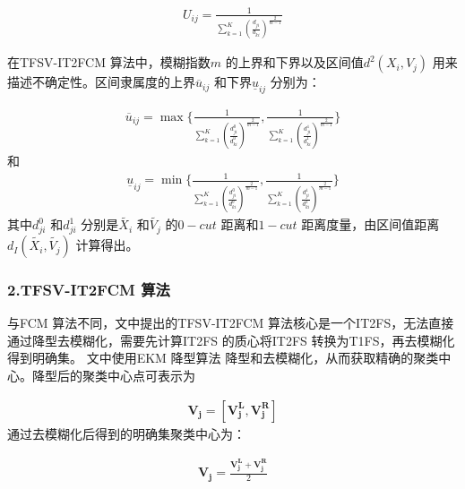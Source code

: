 \begin{equation}\label{eq:12}
    \begin{split}
        U_{ij} = \frac{1}{\sum_{k=1}^K {(\frac{d_{ji}}{d_{ki}})}^{\frac{2}{m-1}}}
    \end{split}
\end{equation}

在TFSV-IT2FCM 算法中，模糊指数$m$ 的上界和下界以及区间值$d^2(X_i,V_j)$ 用来描述不确定性。区间隶属度的上界$\overline{u}_{ij}$ 和下界$\underline{u}_{ij}$ 分别为：

\begin{equation}\label{eq:13}
    \begin{split}
        \overline{u}_{ij} = \max \Bigg \lbrace \frac{1}{\sum_{k=1}^K {(\frac{d_{ji}^0}{d_{ki}^0})}^{\frac{2}{m-1}}}, \frac{1}{\sum_{k=1}^K {(\frac{d_{ji}^1}{d_{ki}^1})}^{\frac{2}{m-1}}} \Bigg \rbrace
    \end{split}
\end{equation}
和
\begin{equation}\label{eq:14}
    \begin{split}
        \underline{u}_{ij} = \min \Bigg \lbrace \frac{1}{\sum_{k=1}^K {(\frac{d_{ji}^0}{d_{ki}^0})}^{\frac{2}{m-1}}}, \frac{1}{\sum_{k=1}^K {(\frac{d_{ji}^1}{d_{ki}^1})}^{\frac{2}{m-1}}} \Bigg \rbrace
    \end{split}
\end{equation}
其中$d_{ji}^0$ 和$d_{ji}^1$ 分别是$\tilde{X_i}$ 和$\tilde{V_j}$ 的$0-cut$ 距离和$1-cut$ 距离度量，由区间值距离$d_{I} (\tilde{X_i}, \tilde{V_j})$ 计算得出。


\subsubsection*{2.TFSV-IT2FCM 算法}
\label{subsubsec::chap03-3-3-2-2}
与FCM 算法不同，文中提出的TFSV-IT2FCM 算法核心是一个IT2FS，无法直接通过降型去模糊化，需要先计算IT2FS 的质心将IT2FS 转换为T1FS，再去模糊化得到明确集\cite{karnik2001centroid}。 文中使用EKM 降型算法\cite{wu2009enhanced} 降型和去模糊化，从而获取精确的聚类中心。降型后的聚类中心点可表示为

\begin{equation}\label{eq:17}
    \begin{split}
        \bm{V_j} = [\bm{V_j^L}, \bm{V_j^R}]
    \end{split}
\end{equation}
通过去模糊化后得到的明确集聚类中心为：

\begin{equation}\label{eq:18}
    \begin{split}
        \bm{V_j} = \frac{\bm{V_j^L}+\bm{V_j^R}}{2}
    \end{split}
\end{equation}


